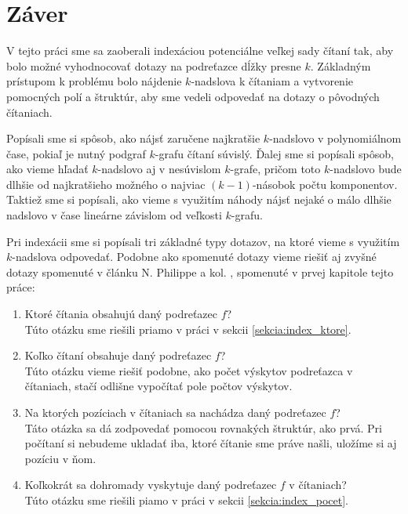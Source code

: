 \chapter*{Záver}

V tejto práci sme sa zaoberali indexáciou potenciálne veľkej sady
čítaní tak, aby bolo možné vyhodnocovať dotazy na podreťazce dĺžky presne $k$.
Základným prístupom k problému bolo nájdenie $k$-nadslova
k čítaniam a vytvorenie pomocných polí a štruktúr, aby sme vedeli
odpovedať na dotazy o pôvodných čítaniach.

Popísali sme si spôsob, ako nájsť zaručene najkratšie $k$-nadslovo
v polynomiálnom čase, pokiaľ je nutný podgraf $k$-grafu čítaní
súvislý. Ďalej sme si popísali spôsob, ako vieme hľadať $k$-nadslovo
aj v nesúvislom $k$-grafe, pričom toto $k$-nadslovo bude dlhšie
od najkratšieho možného o najviac $(k-1)$-násobok počtu komponentov.
Taktiež sme si popísali, ako vieme s využitím náhody nájsť nejaké
o málo dlhšie nadslovo v čase lineárne závislom od veľkosti $k$-grafu.

Pri indexácii sme si popísali tri základné typy dotazov, na ktoré vieme
s využitím $k$-nadslova odpovedať.
Podobne ako spomenuté dotazy vieme riešiť aj zvyšné dotazy spomenuté v
článku N. Philippe a kol. \cite{gk_arrays}, spomenuté v prvej kapitole
tejto práce:
\begin{enumerate}
    \item Ktoré čítania obsahujú daný podreťazec $f$? \\
          Túto otázku sme riešili priamo v práci v sekcii \ref{sekcia:index_ktore}.
    \item Koľko čítaní obsahuje daný podreťazec $f$? \\
          Túto otázku vieme riešiť podobne, ako počet výskytov podreťazca
          v čítaniach, stačí odlišne vypočítať pole počtov výskytov.
    \item Na ktorých pozíciach v čítaniach sa nachádza daný podreťazec $f$? \\
          Táto otázka sa dá zodpovedať pomocou rovnakých štruktúr, ako prvá.
          Pri počítaní si nebudeme ukladať iba, ktoré čítanie sme práve našli,
          uložíme si aj pozíciu v ňom.
    \item Koľkokrát sa dohromady vyskytuje daný podreťazec $f$ v čítaniach? \\
          Túto otázku sme riešili piamo v práci v sekcii \ref{sekcia:index_pocet}.
\end{enumerate}

